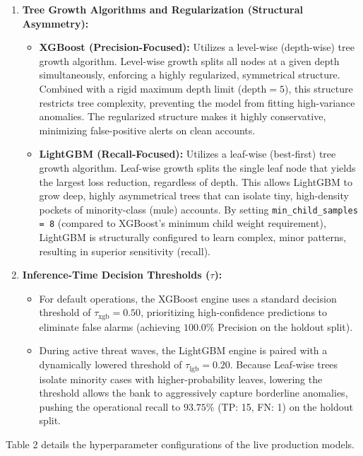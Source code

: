 \documentclass[11pt,a4paper]{article}
\begin{document}
\begin{enumerate}
    \item \textbf{Tree Growth Algorithms and Regularization (Structural Asymmetry):}
    \begin{itemize}
        \item \textbf{XGBoost (Precision-Focused):} Utilizes a level-wise (depth-wise) tree growth algorithm. Level-wise growth splits all nodes at a given depth simultaneously, enforcing a highly regularized, symmetrical structure. Combined with a rigid maximum depth limit ($\text{depth} = 5$), this structure restricts tree complexity, preventing the model from fitting high-variance anomalies. The regularized structure makes it highly conservative, minimizing false-positive alerts on clean accounts.
        \item \textbf{LightGBM (Recall-Focused):} Utilizes a leaf-wise (best-first) tree growth algorithm. Leaf-wise growth splits the single leaf node that yields the largest loss reduction, regardless of depth. This allows LightGBM to grow deep, highly asymmetrical trees that can isolate tiny, high-density pockets of minority-class (mule) accounts. By setting \texttt{min\_child\_samples = 8} (compared to XGBoost's minimum child weight requirement), LightGBM is structurally configured to learn complex, minor patterns, resulting in superior sensitivity (recall).
    \end{itemize}
    \item \textbf{Inference-Time Decision Thresholds ($\tau$):}
    \begin{itemize}
        \item For default operations, the XGBoost engine uses a standard decision threshold of $\tau_{\text{xgb}} = 0.50$, prioritizing high-confidence predictions to eliminate false alarms (achieving $100.0\%$ Precision on the holdout split).
        \item During active threat waves, the LightGBM engine is paired with a dynamically lowered threshold of $\tau_{\text{lgb}} = 0.20$. Because Leaf-wise trees isolate minority cases with higher-probability leaves, lowering the threshold allows the bank to aggressively capture borderline anomalies, pushing the operational recall to $93.75\%$ (TP: 15, FN: 1) on the holdout split.
    \end{itemize}
\end{enumerate}

Table 2 details the hyperparameter configurations of the live production models.
\end{document}
